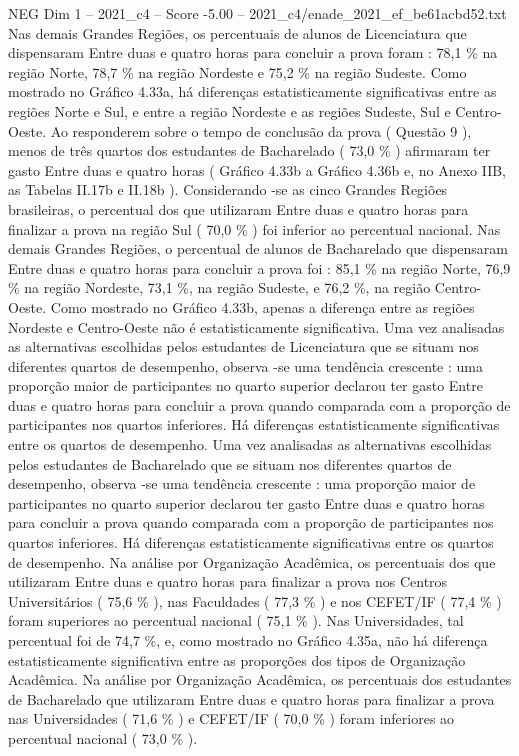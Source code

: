 \begin{textsample}{NEG Dim 1 – 2021\_c4 – Score -5.00 – 2021\_c4/enade\_2021\_ef\_be61acbd52.txt}
Nas demais Grandes Regiões, os percentuais de alunos de Licenciatura que dispensaram Entre duas e quatro horas para concluir a prova foram : 78,1 \% na região Norte, 78,7 \% na região Nordeste e 75,2 \% na região Sudeste.
Como mostrado no Gráfico 4.33a, há diferenças estatisticamente significativas entre as regiões Norte e Sul, e entre a região Nordeste e as regiões Sudeste, Sul e Centro-Oeste.
Ao responderem sobre o tempo de conclusão da prova ( Questão 9 ), menos de três quartos dos estudantes de Bacharelado ( 73,0 \% ) afirmaram ter gasto Entre duas e quatro horas ( Gráfico 4.33b a Gráfico 4.36b e, no Anexo IIB, as Tabelas II.17b e II.18b ).
Considerando -se as cinco Grandes Regiões brasileiras, o percentual dos que utilizaram Entre duas e quatro horas para finalizar a prova na região Sul ( 70,0 \% ) foi inferior ao percentual nacional.
Nas demais Grandes Regiões, o percentual de alunos de Bacharelado que dispensaram Entre duas e quatro horas para concluir a prova foi : 85,1 \% na região Norte, 76,9 \% na região Nordeste, 73,1 \%, na região Sudeste, e 76,2 \%, na região Centro-Oeste.
Como mostrado no Gráfico 4.33b, apenas a diferença entre as regiões Nordeste e Centro-Oeste não é estatisticamente significativa.
Uma vez analisadas as alternativas escolhidas pelos estudantes de Licenciatura que se situam nos diferentes quartos de desempenho, observa -se uma tendência crescente : uma proporção maior de participantes no quarto superior declarou ter gasto Entre duas e quatro horas para concluir a prova quando comparada com a proporção de participantes nos quartos inferiores.
Há diferenças estatisticamente significativas entre os quartos de desempenho.
Uma vez analisadas as alternativas escolhidas pelos estudantes de Bacharelado que se situam nos diferentes quartos de desempenho, observa -se uma tendência crescente : uma proporção maior de participantes no quarto superior declarou ter gasto Entre duas e quatro horas para concluir a prova quando comparada com a proporção de participantes nos quartos inferiores.
Há diferenças estatisticamente significativas entre os quartos de desempenho.
Na análise por Organização Acadêmica, os percentuais dos que utilizaram Entre duas e quatro horas para finalizar a prova nos Centros Universitários ( 75,6 \% ), nas Faculdades ( 77,3 \% ) e nos CEFET/IF ( 77,4 \% ) foram superiores ao percentual nacional ( 75,1 \% ).
Nas Universidades, tal percentual foi de 74,7 \%, e, como mostrado no Gráfico 4.35a, não há diferença estatisticamente significativa entre as proporções dos tipos de Organização Acadêmica.
Na análise por Organização Acadêmica, os percentuais dos estudantes de Bacharelado que utilizaram Entre duas e quatro horas para finalizar a prova nas Universidades ( 71,6 \% ) e CEFET/IF ( 70,0 \% ) foram inferiores ao percentual nacional ( 73,0 \% ).

\end{textsample}
